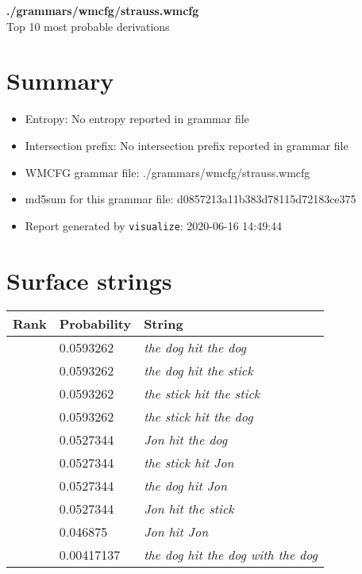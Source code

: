 \documentclass[11pt]{article}
\begin{document}
\begin{center}
{\huge \textbf{./grammars/wmcfg/strauss.wmcfg}} \\[0.5em]
{\normalsize Top 10 most probable derivations}
\end{center}

\section{Summary}
\begin{itemize}
	\item Entropy: No entropy reported in grammar file
	\item Intersection prefix: No intersection prefix reported in grammar file
	\item WMCFG grammar file: ./grammars/wmcfg/strauss.wmcfg
	\item md5sum for this grammar file: d0857213a11b383d78115d72183ce375
	\item Report generated by \texttt{visualize}: 2020-06-16 14:49:44
\end{itemize}

\section{Surface strings}
\hspace{1em}
\renewcommand{\arraystretch}{1.15}
\newcommand\rownumber{\stepcounter{rownumber}\arabic{rownumber}}
\begin{tabular}{l l l}
	\hline
	 Rank & Probability & String \\
	\hline
\rownumber & 0.0593262 & \textit{the dog hit the dog} \\
\rownumber & 0.0593262 & \textit{the dog hit the stick} \\
\rownumber & 0.0593262 & \textit{the stick hit the stick} \\
\rownumber & 0.0593262 & \textit{the stick hit the dog} \\
\rownumber & 0.0527344 & \textit{Jon hit the dog} \\
\rownumber & 0.0527344 & \textit{the stick hit Jon} \\
\rownumber & 0.0527344 & \textit{the dog hit Jon} \\
\rownumber & 0.0527344 & \textit{Jon hit the stick} \\
\rownumber & 0.046875 & \textit{Jon hit Jon} \\
\rownumber & 0.00417137 & \textit{the dog hit the dog with the dog} \\
	\hline
\end{tabular}
\pagebreak
\end{document}
